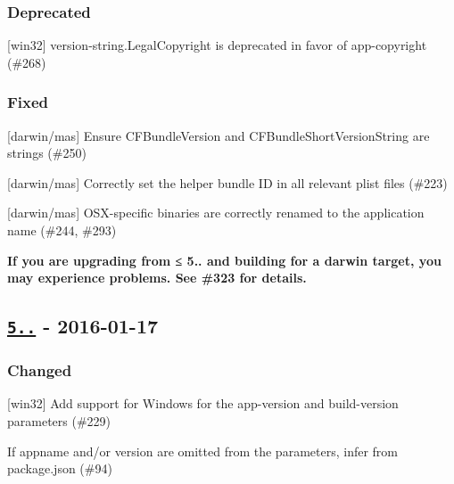 \subsubsection*{Deprecated}


\begin{DoxyItemize}
\item \mbox{[}win32\mbox{]} {\ttfamily version-\/string.\+Legal\+Copyright} is deprecated in favor of {\ttfamily app-\/copyright} (\#268)
\end{DoxyItemize}

\subsubsection*{Fixed}


\begin{DoxyItemize}
\item \mbox{[}darwin/mas\mbox{]} Ensure {\ttfamily C\+F\+Bundle\+Version} and {\ttfamily C\+F\+Bundle\+Short\+Version\+String} are strings (\#250)
\item \mbox{[}darwin/mas\mbox{]} Correctly set the helper bundle ID in all relevant plist files (\#223)
\item \mbox{[}darwin/mas\mbox{]} O\+S\+X-\/specific binaries are correctly renamed to the application name (\#244, \#293)

{\bfseries If you are upgrading from ≤ 5.. and building for a {\ttfamily darwin} target, you may experience problems. See \#323 for details.}
\end{DoxyItemize}

\subsection*{\href{https://github.com/electron-userland/electron-packager/compare/v5.2.0...v5.2.1}{\tt 5..} -\/ 2016-\/01-\/17}

\subsubsection*{Changed}


\begin{DoxyItemize}
\item \mbox{[}win32\mbox{]} Add support for Windows for the {\ttfamily app-\/version} and {\ttfamily build-\/version} parameters (\#229)
\item If {\ttfamily appname} and/or {\ttfamily version} are omitted from the parameters, infer from {\ttfamily package.\+json} (\#94)
\end{DoxyItemize}

